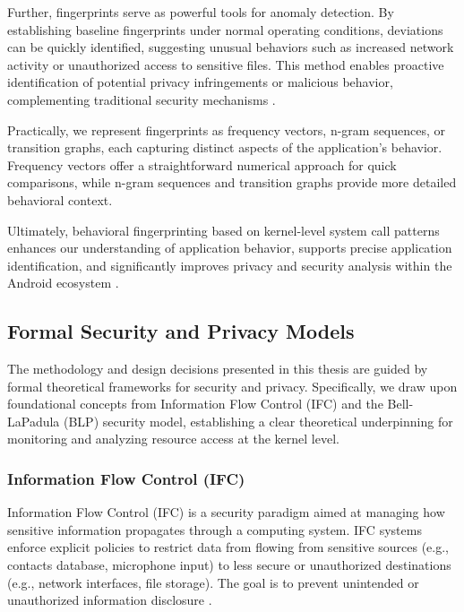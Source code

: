 \documentclass[a4paper,12pt]{report}
\begin{document}
Further, fingerprints serve as powerful tools for anomaly detection. By establishing baseline fingerprints under normal operating conditions, deviations can be quickly identified, suggesting unusual behaviors such as increased network activity or unauthorized access to sensitive files. This method enables proactive identification of potential privacy infringements or malicious behavior, complementing traditional security mechanisms \cite{chandola2009anomaly}.

Practically, we represent fingerprints as frequency vectors, n-gram sequences, or transition graphs, each capturing distinct aspects of the application's behavior. Frequency vectors offer a straightforward numerical approach for quick comparisons, while n-gram sequences and transition graphs provide more detailed behavioral context.

Ultimately, behavioral fingerprinting based on kernel-level system call patterns enhances our understanding of application behavior, supports precise application identification, and significantly improves privacy and security analysis within the Android ecosystem \cite{felt2011androidprivacy}.



\subsection{Formal Security and Privacy Models}

The methodology and design decisions presented in this thesis are guided by formal theoretical frameworks for security and privacy. Specifically, we draw upon foundational concepts from Information Flow Control (IFC) and the Bell-LaPadula (BLP) security model, establishing a clear theoretical underpinning for monitoring and analyzing resource access at the kernel level.

\subsubsection{Information Flow Control (IFC)}

Information Flow Control (IFC) is a security paradigm aimed at managing how sensitive information propagates through a computing system. IFC systems enforce explicit policies to restrict data from flowing from sensitive sources (e.g., contacts database, microphone input) to less secure or unauthorized destinations (e.g., network interfaces, file storage). The goal is to prevent unintended or unauthorized information disclosure \cite{myers1999jflow,sabelfeld2003language}.
\end{document}
